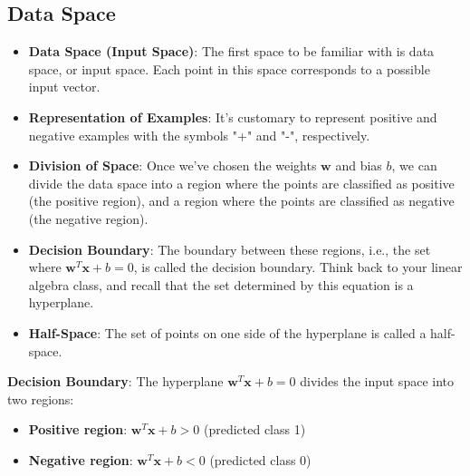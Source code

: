 \subsection{Data Space}
\begin{itemize}
    \item \textbf{Data Space (Input Space)}: The first space to be familiar with is data space, or input space. Each point in this space corresponds to a possible input vector.
        \item \textbf{Representation of Examples}: It's customary to represent positive and negative examples with the symbols "+" and "-", respectively.
        
        \item \textbf{Division of Space}: Once we've chosen the weights $\bm{w}$ and bias $b$, we can divide the data space into a region where the points are classified as positive (the positive region), and a region where the points are classified as negative (the negative region).
    
        \item \textbf{Decision Boundary}: The boundary between these regions, i.e., the set where $\bm{w}^T \bm{x} + b = 0$, is called the decision boundary. Think back to your linear algebra class, and recall that the set determined by this equation is a hyperplane.
        
        \item \textbf{Half-Space}: The set of points on one side of the hyperplane is called a half-space.
\end{itemize}


\textbf{Decision Boundary}: The hyperplane $\bm{w}^T\bm{x} + b = 0$ divides the input space into two regions:
\begin{itemize}
    \item \textbf{Positive region}: $\bm{w}^T\bm{x} + b > 0$ (predicted class 1)
    \item \textbf{Negative region}: $\bm{w}^T\bm{x} + b < 0$ (predicted class 0)
\end{itemize}

